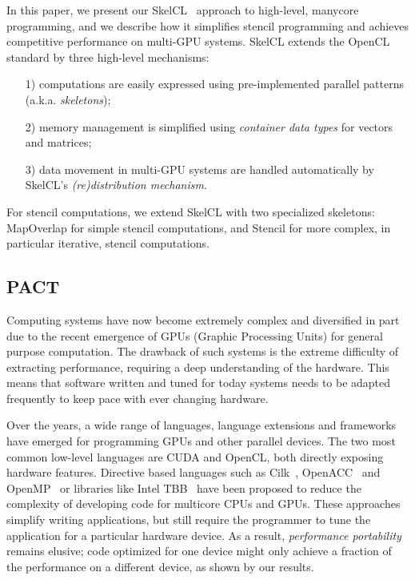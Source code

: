 In this paper, we present our SkelCL~\cite{SteuwerGo2013a} approach to high-level, manycore programming, and we describe how it simplifies stencil programming and achieves competitive performance on multi-GPU systems.
SkelCL extends the OpenCL standard by three high-level mechanisms:
\begin{itemize}
  \item[1)] computations are easily expressed using pre-implemented parallel patterns (a.k.a. \emph{skeletons});
  \item[2)] memory management is simplified using \emph{container data types} for vectors and matrices;
  \item[3)] data movement in multi-GPU systems are handled automatically by SkelCL's \emph{(re)distribution mechanism}.
\end{itemize}

For stencil computations, we extend SkelCL with two specialized skeletons: MapOverlap for simple stencil computations, and Stencil for more complex, in particular iterative, stencil computations.

\subsection{PACT}
Computing systems have now become extremely complex and diversified in part due to the recent emergence of GPUs (Graphic Processing Units) for general purpose computation.
The drawback of such systems is the extreme difficulty of extracting performance, requiring a deep understanding of the hardware.
This means that software written and tuned for today systems needs to be adapted frequently to keep pace with ever changing hardware.

Over the years, a wide range of languages, language extensions and frameworks have emerged for programming GPUs and other parallel devices. 
The two most common low-level languages are CUDA and OpenCL, both directly exposing hardware features.
Directive based languages such as Cilk~\cite{BlumofeJKLRZ95}, Open\-ACC~\cite{ReyesLFS12} and OpenMP~\cite{LeeME09} or libraries like Intel TBB~\cite{Reinders07} have been proposed to reduce the complexity of developing code for multicore CPUs and GPUs.
These approaches simplify writing applications, but still require the programmer to tune the application for a particular hardware device.
As a result, \emph{performance portability} remains elusive; code optimized for one device might only achieve a fraction of the performance on a different device, as shown by our results.

